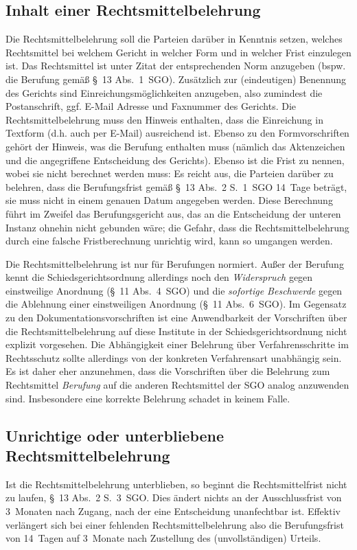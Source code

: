 \subsection{Inhalt einer Rechtsmittelbelehrung}
Die Rechtsmittelbelehrung soll die Parteien darüber in Kenntnis setzen, welches Rechtsmittel bei welchem Gericht in welcher Form und in welcher Frist einzulegen ist. Das Rechtsmittel ist unter Zitat der entsprechenden Norm anzugeben (bspw. die Berufung gemäß §~13 Abs.~1~SGO). Zusätzlich zur (eindeutigen) Benennung des Gerichts sind Einreichungsmöglichkeiten anzugeben, also zumindest die Postanschrift, ggf. E-Mail Adresse und Faxnummer des Gerichts. Die Rechtsmittelbelehrung muss den Hinweis enthalten, dass die Einreichung in Textform (d.h. auch per E-Mail) ausreichend ist. Ebenso zu den Formvorschriften gehört der Hinweis, was die Berufung enthalten muss (nämlich das Aktenzeichen und die angegriffene Entscheidung des Gerichts). Ebenso ist die Frist zu nennen, wobei sie nicht berechnet werden muss: Es reicht aus, die Parteien darüber zu belehren, dass die Berufungsfrist gemäß §~13 Abs.~2 S.~1~SGO 14~Tage beträgt, sie muss nicht in einem genauen Datum angegeben werden. Diese Berechnung führt im Zweifel das Berufungsgericht aus, das an die Entscheidung der unteren Instanz ohnehin nicht gebunden wäre; die Gefahr, dass die Rechtsmittelbelehrung durch eine falsche Fristberechnung unrichtig wird, kann so umgangen werden.

Die Rechtsmittelbelehrung ist nur für Berufungen normiert. Außer der Berufung kennt die Schiedsgerichtsordnung allerdings noch den \emph{Widerspruch} gegen einstweilige Anordnung (§~11 Abs.~4~SGO) und die \emph{sofortige Beschwerde} gegen die Ablehnung einer einstweiligen Anordnung (§~11 Abs.~6~SGO). Im Gegensatz zu den Dokumentationsvorschriften ist eine Anwendbarkeit der Vorschriften über die Rechtsmittelbelehrung auf diese Institute in der Schiedsgerichtsordnung nicht explizit vorgesehen. Die Abhängigkeit einer Belehrung über Verfahrensschritte im Rechtsschutz sollte allerdings von der konkreten Verfahrensart unabhängig sein. Es ist daher eher anzunehmen, dass die Vorschriften über die Belehrung zum Rechtsmittel \emph{Berufung} auf die anderen Rechtsmittel der SGO analog anzuwenden sind. Insbesondere eine korrekte Belehrung schadet in keinem Falle.

\subsection{Unrichtige oder unterbliebene Rechtsmittelbelehrung}
Ist die Rechtsmittelbelehrung unterblieben, so beginnt die Rechtsmittelfrist nicht zu laufen, §~13 Abs.~2 S.~3~SGO. Dies ändert nichts an der Ausschlussfrist von 3~Monaten nach Zugang, nach der eine Entscheidung unanfechtbar ist. Effektiv verlängert sich bei einer fehlenden Rechtsmittelbelehrung also die Berufungsfrist von 14~Tagen auf 3~Monate nach Zustellung des (unvollständigen) Urteils.

